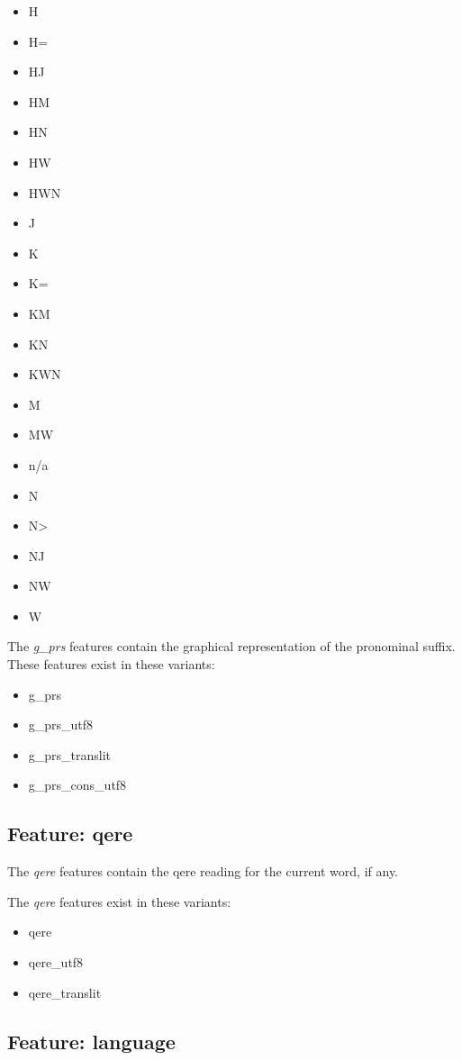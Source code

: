\documentclass[11pt,oneside,a4paper]{memoir}
\begin{document}
\begin{itemize}
\item H  
\item H= 
\item HJ 
\item HM 
\item HN 
\item HW 
\item HWN
\item J  
\item K  
\item K= 
\item KM 
\item KN 
\item KWN
\item M  
\item MW 
\item n/a
\item N  
\item N> 
\item NJ 
\item NW 
\item W  
\end{itemize}


The \emph{g\_prs} features contain the graphical representation of the pronominal suffix.
These features exist in these variants:

\begin{itemize}
\item g\_prs
\item g\_prs\_utf8
\item g\_prs\_translit
\item g\_prs\_cons\_utf8
\end{itemize}


\subsection{Feature: qere}

The \emph{qere} features contain the qere reading for the current word, if any.

The \emph{qere} features exist in these variants:

\begin{itemize}
\item qere
\item qere\_utf8
\item qere\_translit
\end{itemize}

\subsection{Feature: language}
\end{document}
